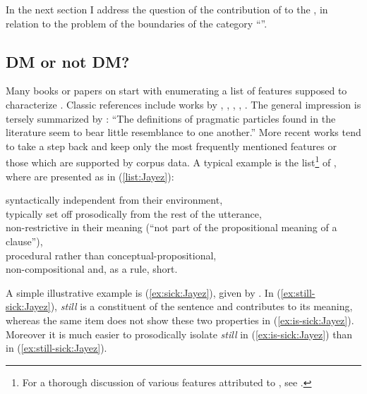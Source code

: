 \documentclass[output=paper,colorlinks,citecolor=brown]{langscibook}
\begin{document}
In the next section I address the question of the contribution of  to the , in relation to the problem of the boundaries of the category ``''.

\subsection{DM or not DM?}
\label{sec-DM-identity:Jayez}
\largerpage[1]
Many books or papers on  start with enumerating a list of features supposed to characterize . Classic references include works by \citet{Schiffrin:1987}, \citet{Brinton:1996}, \citet{Schourup:1999}, \citet{Aijmer:2002,Aijmer:2013}, \citet{Beeching:2016}. The general impression is tersely summarized by \citet[30]{Brinton:1996}: ``The definitions of pragmatic particles found in the literature seem to bear little resemblance to one another.''
More recent works \citep{Crible:2017,FedrianiandSansopaper:2017,Heineetal:2021} tend to take a step back and keep only the most frequently mentioned features or those which are supported by corpus data. A typical example is the list\footnote{For a thorough discussion of various features attributed to , see \citet[section 2.1]{Brinton:1996}.} of \citet[1209]{Heine:2013}, where  are presented as in (\ref{list:Jayez}):

\ea
\label{list:Jayez}
\ea syntactically independent from their environment,\\
\ex typically set off prosodically from the rest of the utterance,\\
\ex \label{list3:Jayez}
non-restrictive in their meaning (``not part of the propositional meaning of a clause''),\\
\ex procedural rather than conceptual-propositional,\\
\ex non-compositional and, as a rule, short.
\z
\z

A simple illustrative example is (\ref{ex:sick:Jayez}), given by \citet[3]{Heineetal:2021}. In (\ref{ex:still-sick:Jayez}), \textit{still} is a constituent of the sentence and contributes to its meaning, whereas the same item does not show these two properties in (\ref{ex:is-sick:Jayez}). Moreover it is much easier to prosodically isolate \textit{still} in (\ref{ex:is-sick:Jayez}) than in (\ref{ex:still-sick:Jayez}). 
\end{document}

